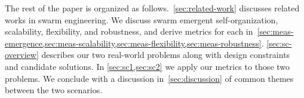 %
The rest of the paper is organized as follows.~\cref{sec:related-work} discusses
related works in swarm engineering. We discuss swarm emergent self-organization,
scalability, flexibility, and robustness, and derive metrics for each
in~\cref{sec:meas-emergence,sec:meas-scalability,sec:meas-flexibility,sec:meas-robustness}.
\cref{sec:sc-overview} describes our two real-world problems along with design
constraints and candidate solutions. In \cref{sec:sc1,sec:sc2} we apply our
metrics to those two problems. We conclude with a discussion
in~\cref{sec:discussion} of common themes between the two scenarios.

